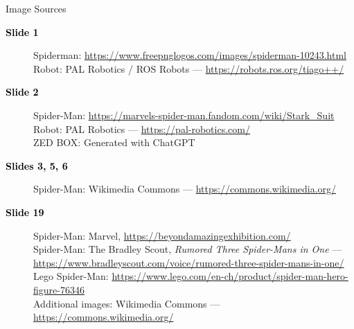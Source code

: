 \documentclass[aspectratio=169]{beamer}
\begin{document}
      \begin{frame}{Image Sources}
\scriptsize

\begin{description}

    \item[\textcolor{black}{\textbf{Slide 1}}]
    Spiderman: \url{https://www.freepnglogos.com/images/spiderman-10243.html}\\
    Robot: PAL Robotics / ROS Robots --- \url{https://robots.ros.org/tiago++/}

    \item[\textcolor{black}{\textbf{Slide 2}}]
    Spider-Man: \url{https://marvels-spider-man.fandom.com/wiki/Stark_Suit}\\
    Robot: PAL Robotics --- \url{https://pal-robotics.com/}\\
    ZED BOX: Generated with ChatGPT

    \item[\textcolor{black}{\textbf{Slides 3, 5, 6}}]
    Spider-Man: Wikimedia Commons ---
    \url{https://commons.wikimedia.org/}

    \item[\textcolor{black}{\textbf{Slide 19}}]
    Spider-Man: Marvel, \url{https://beyondamazingexhibition.com/}\\
    Spider-Man: The Bradley Scout, \textit{Rumored Three Spider-Mans in One} ---
    \url{https://www.bradleyscout.com/voice/rumored-three-spider-mans-in-one/}\\
    Lego Spider-Man: \url{https://www.lego.com/en-ch/product/spider-man-hero-figure-76346}\\
    Additional images: Wikimedia Commons ---
    \url{https://commons.wikimedia.org/}

\end{description}

\end{frame}
\end{document}
